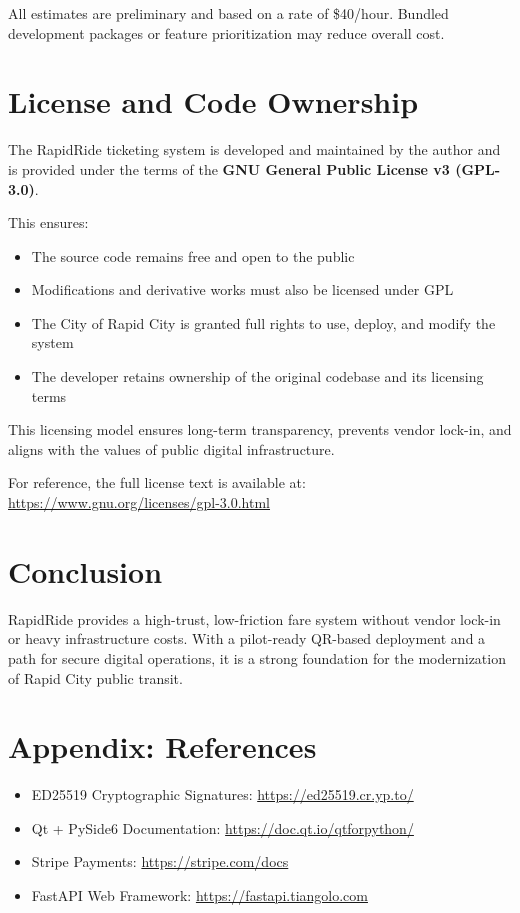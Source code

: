 \documentclass[12pt]{article}
\begin{document}
\vspace{1em}
\noindent All estimates are preliminary and based on a rate of \$40/hour. Bundled development packages or feature prioritization may reduce overall cost.


\section{License and Code Ownership}

The RapidRide ticketing system is developed and maintained by the author and is provided under the terms of the \textbf{GNU General Public License v3 (GPL-3.0)}.

This ensures:
\begin{itemize}
    \item The source code remains free and open to the public
    \item Modifications and derivative works must also be licensed under GPL
    \item The City of Rapid City is granted full rights to use, deploy, and modify the system
    \item The developer retains ownership of the original codebase and its licensing terms
\end{itemize}

This licensing model ensures long-term transparency, prevents vendor lock-in, and aligns with the values of public digital infrastructure.

For reference, the full license text is available at: \url{https://www.gnu.org/licenses/gpl-3.0.html}



\section{Conclusion}
RapidRide provides a high-trust, low-friction fare system without vendor lock-in or heavy infrastructure costs. With a pilot-ready QR-based deployment and a path for secure digital operations, it is a strong foundation for the modernization of Rapid City public transit.

\appendix
\section{Appendix: References}
\begin{itemize}
    \item ED25519 Cryptographic Signatures: \url{https://ed25519.cr.yp.to/}
    \item Qt + PySide6 Documentation: \url{https://doc.qt.io/qtforpython/}
    \item Stripe Payments: \url{https://stripe.com/docs}
    \item FastAPI Web Framework: \url{https://fastapi.tiangolo.com}
\end{itemize}
\end{document}
